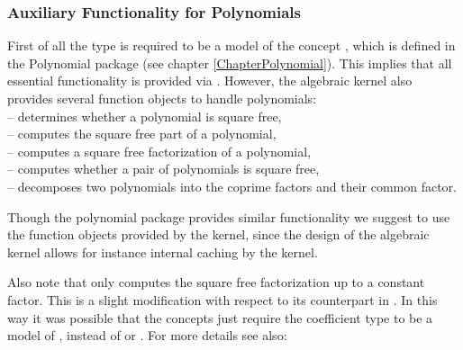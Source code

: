 
\subsubsection{Auxiliary Functionality for Polynomials}

First of all the type  is required
to be a model of the concept , which is defined
in the Polynomial package (see chapter \ref{ChapterPolynomial}).
This implies that all essential functionality is provided via
. However, the algebraic kernel also
provides several function objects to handle polynomials:\\
 -- determines whether a polynomial is square free,\\
 -- computes the square free part of a polynomial,\\
 -- computes a square free factorization of a polynomial,\\
 -- computes whether a pair of polynomials is square free,\\
 -- decomposes two polynomials into the coprime factors and their common factor. 

Though the polynomial package provides similar functionality we suggest to use 
the function objects provided by the kernel, since the design of the algebraic kernel 
allows for instance internal caching by the kernel. 


Also note that   only computes the square free 
factorization up to a constant factor. This is a slight modification with respect to its 
counterpart in . In this way it was possible that the concepts just require 
the coefficient type to be a model of , instead of  or . 
For more details see also:\\
 \\
\\

